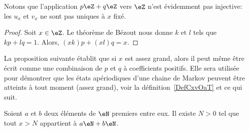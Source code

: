 Notons que l'application \( p\eZ+q\eZ\) vers \( \eZ\) n'est évidemment pas injective: les \( u_x\) et \( v_x\) ne sont pas uniques à \( x\) fixé.

\begin{proof}
	Soit \( x\in \eZ\). Le théorème de Bézout nous donne \( k\) et \( l\) tels que \( kp+lq=1\). Alors, \( (xk)p+(xl)q=x\).
\end{proof}

La proposition suivante établit que si \( x\) est assez grand, alors il peut même être écrit comme une combinaison de \( p\) et \( q\) à coefficients positifs. Elle sera utilisée pour démontrer que les états apériodiques d'une chaine de Markov peuvent être atteints à tout moment (assez grand), voir la définition~\ref{DefCxvOaT} et ce qui suit.

\begin{proposition}     \label{PropLAbRSE}
	Soient \( a\) et \( b\) deux éléments de \( \eN\) premiers entre eux. Il existe \( N>0\) tel que tout \( x>N\) appartient à \( a\eN+b\eN\).
\end{proposition}

